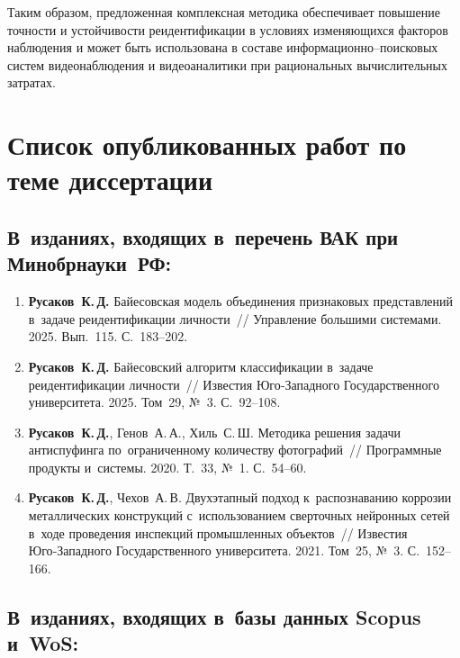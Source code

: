 Таким образом, предложенная комплексная методика обеспечивает повышение точности
и устойчивости реидентификации в условиях изменяющихся факторов наблюдения и может
быть использована в составе информационно--поисковых систем видеонаблюдения и
видеоаналитики при рациональных вычислительных затратах.

\section*{Список опубликованных работ по теме диссертации}

\subsection*{В~изданиях, входящих в~перечень ВАК при Минобрнауки~РФ:}

\begin{enumerate}
    \item \textbf{Русаков~К.\,Д.} Байесовская модель объединения признаковых
          представлений в~задаче реидентификации личности~// Управление большими
          системами. 2025. Вып.~115. С.~183--202.
    \item \textbf{Русаков~К.\,Д.} Байесовский алгоритм классификации в~задаче
          реидентификации личности~// Известия Юго‑Западного Государственного
          университета. 2025. Том~29, №~3. С.~92--108.
    \item \textbf{Русаков~К.\,Д.}, Генов~А.\,А., Хиль~С.\,Ш. Методика решения
          задачи антиспуфинга по~ограниченному количеству фотографий~//
          Программные продукты и~системы. 2020. Т.~33, №~1. С.~54--60.
    \item \textbf{Русаков~К.\,Д.}, Чехов~А.\,В. Двухэтапный подход
          к~распознаванию коррозии металлических конструкций с~использованием
          сверточных нейронных сетей в~ходе проведения инспекций промышленных
          объектов~// Известия Юго‑Западного Государственного университета. 2021.
          Том~25, №~3. С.~152--166.
\end{enumerate}

\subsection*{В~изданиях, входящих в~базы данных Scopus и~WoS:}

